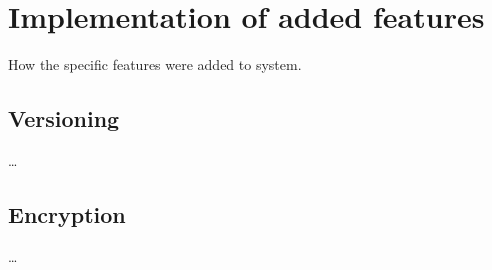 \chapter{Implementation of added features}

How the specific features were added to system.

\section{Versioning}

\ldots

\section{Encryption}

\ldots